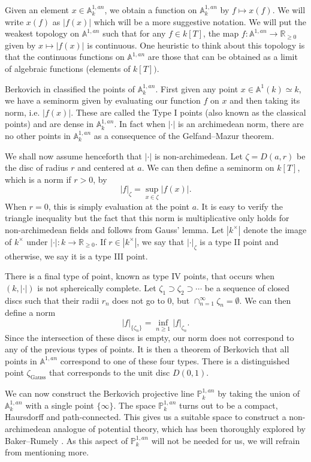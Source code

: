 \documentclass[10pt]{amsart}
\newcommand{\bb}{\mathbb}
\newcommand{\berkP}{\mathbb{P}^{1,an}}
\newcommand{\berkA}{\mathbb{A}^{1,an}}
\newcommand{\Gauss}{\operatorname{Gauss}}
\numberwithin{theorem}{section}
\numberwithin{example}{section}
\numberwithin{definition}{section}
\begin{document}
Given an element $x \in \berkA_k$, we obtain a function on $\berkA_k$ by $f \mapsto x(f)$. We will write $x(f)$ as $|f(x)|$ which will be a more suggestive notation. We will put the weakest topology on $\berkA$ such that for any $f \in k[T]$, the map $f: \berkA \to \bb{R}_{\geq 0}$ given by $x \mapsto |f(x)|$ is continuous. One heuristic to think about this topology is that the continuous functions on $\berkA$ are those that can be obtained as a limit of algebraic functions (elements of $k[T])$. 
\par 
Berkovich in \cite{Ber90} classified the points of $\berkA_k$. First given any point $x \in \bb{A}^1(k) \simeq k$, we have a seminorm given by evaluating our function $f$ on $x$ and then taking its norm, i.e. $|f(x)|$. These are called the Type I points (also known as the classical points) and are dense in $\berkA_k$. In fact when $| \cdot |$ is an archimedean norm, there are no other points in $\berkA_k$ as a consequence of the Gelfand--Mazur theorem. 
\par 
We shall now assume henceforth that $| \cdot |$ is non-archimedean. Let $\zeta = D(a,r)$ be the disc of radius $r$ and centered at $a$. We can then define a seminorm on $k[T]$, which is a norm if $r > 0$, by
$$|f|_{\zeta} = \sup_{x \in \zeta} |f(x)|.$$
When $r = 0$, this is simply evaluation at the point $a$. It is easy to verify the triangle inequality but the fact that this norm is multiplicative only holds for non-archimedean fields and follows from Gauss' lemma. Let $|k^{\times}|$ denote the image of $k^{\times}$ under $| \cdot |: k \to \bb{R}_{\geq 0}$. If $r \in |k^{\times}|$, we say that $| \cdot |_{\zeta}$ is a type II point and otherwise, we say it is a type III point. 
\par 
There is a final type of point, known as type IV points, that occurs when $(k , | \cdot |)$ is not sphereically complete. Let $\zeta_1 \supset \zeta_2 \supset \cdots$ be a sequence of closed discs such that their radii $r_n$ does not go to $0$, but $\cap_{n=1}^{\infty} \zeta_n = \emptyset$. We can then define a norm
$$|f |_{\{\zeta_n\}} = \inf_{n \geq 1} |f|_{\zeta_n}.$$
Since the intersection of these discs is empty, our norm does not correspond to any of the previous types of points. It is then a theorem of Berkovich \cite{Ber90} that all points in $\berkA$ correspond to one of these four types. There is a distinguished point $\zeta_{\Gauss}$ that corresponds to the unit disc $D(0,1)$.
\par 
We can now construct the Berkovich projective line $\berkP_k$ by taking the union of $\berkA_k$ with a single point $\{\infty\}$. The space $\berkP_k$ turns out to be a compact, Haursdorff and path-connected. This gives us a suitable space to construct a non-archimedean analogue of potential theory, which has been thoroughly explored by Baker--Rumely \cite{BR10}. As this aspect of $\berkP_k$ will not be needed for us, we will refrain from mentioning more. 
\end{document}
